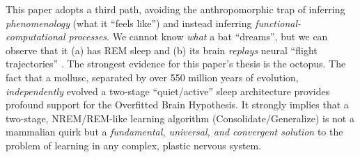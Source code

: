 This paper adopts a third path, avoiding the anthropomorphic trap of inferring \textit{phenomenology} (what it ``feels like'') \citep{lee2024} and instead inferring \textit{functional-computational processes}. We cannot know \textit{what} a bat ``dreams'', but we can observe that it (a) has REM sleep and (b) its brain \textit{replays} neural ``flight trajectories'' \citep{omer2025batreplay}. The strongest evidence for this paper's thesis is the octopus. The fact that a mollusc, separated by over 550 million years of evolution, \textit{independently} evolved a two-stage ``quiet/active'' sleep architecture \citep{medeiros2023octopus} provides profound support for the Overfitted Brain Hypothesis. It strongly implies that a two-stage, NREM/REM-like learning algorithm (Consolidate/Generalize) is not a mammalian quirk but a \textit{fundamental, universal, and convergent solution} to the problem of learning in any complex, plastic nervous system.
